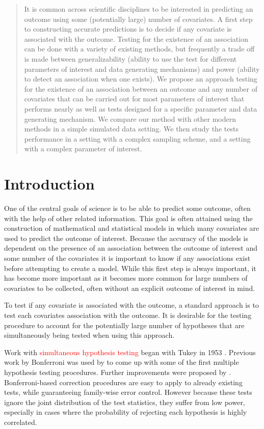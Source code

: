 \documentclass{article}
\author{Adam Elder}
\begin{document}
 
\doublespacing


\begin{abstract}
It is common across scientific disciplines to be interested in predicting an outcome using some (potentially large) number of covariates.  A first step to constructing accurate predictions is to decide if any covariate is associated with the outcome. Testing for the existence of an association can be done with a variety of existing methods, but frequently a trade off is made between generalizability (ability to use the test for different parameters of interest and data generating mechanisms) and power (ability to detect an association when one exists).  We propose an approach testing for the existence of an association between an outcome and any number of covariates that can be carried out for most parameters of interest that performs nearly as well as tests designed for a specific parameter and data generating mechanism.  We compare our method with other modern methods in a simple simulated data setting.  We then study the tests performance in a setting with a complex sampling scheme, and a setting with a complex parameter of interest.  
\end{abstract}

\section{Introduction}

One of the central goals of science is to be able to predict some outcome, often with the help of other related information.  This goal is often attained using the construction of mathematical and statistical models in which many covariates are used to predict the outcome of interest. Because the accuracy of the models is dependent on the presence of an association between the outcome of interest and some number of the covariates it is important to know if any associations exist before attempting to create a model. While this first step is always important, it has become more important as it becomes more common for large numbers of covariates to be collected, often without an explicit outcome of interest in mind.

To test if any covariate is associated with the outcome, a standard approach is to test each covariates association with the outcome. It is desirable for the testing procedure to account for the potentially large number of hypotheses that are simultaneously being tested when using this approach.

Work with \textcolor{red}{simultaneous hypothesis testing}
began with Tukey in 1953 \citep{miller_simultaneous_1981}.  Previous work by Bonferroni was used by \citep{dunn_estimation_1959,dunn_multiple_1961} to come up with some of the first multiple hypothesis testing procedures.  Further improvements were proposed by \citep{hochberg_sharper_1988,holm_simple_1979,s._holland_improved_1988}.  Bonferroni-based correction procedures are easy to apply to already existing tests, while guaranteeing family-wise error control. However because these tests ignore the joint distribution of the test statistics, they suffer from low power, especially in cases where the probability of rejecting each hypothesis is highly correlated. 
\end{document}
